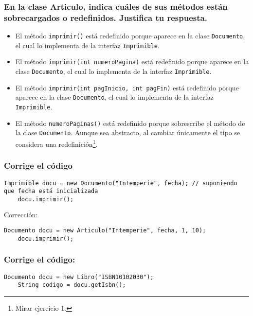 \documentclass[a4paper,12pt]{article}
\begin{document}
\subsubsection*{En la clase Articulo, indica cuáles de sus métodos están sobrecargados o redefinidos. Justifica tu respuesta.}

\begin{itemize}
    \item El método \texttt{imprimir()} está redefinido porque aparece en la clase \texttt{Documento}, el cual lo implementa de la interfaz \texttt{Imprimible}.
    \item El método \texttt{imprimir(int numeroPagina)} está redefinido porque aparece en la clase \texttt{Documento}, el cual lo implementa de la interfaz \texttt{Imprimible}.
    \item El método \texttt{imprimir(int pagInicio, int pagFin)} está redefinido porque aparece en la clase \texttt{Documento}, el cual lo implementa de la interfaz \texttt{Imprimible}.
    \item El método \texttt{numeroPaginas()} está redefinido porque sobrescribe el método de la clase \texttt{Documento}. Aunque sea abstracto, al cambiar únicamente el tipo se considera una redefinición\footnote{Mirar ejercicio 1.}.
\end{itemize}

\subsubsection*{Corrige el código}

    \begin{lstlisting}[style=customjava, caption = {Código a corregir}]
    Imprimible docu = new Documento("Intemperie", fecha); // suponiendo que fecha está inicializada
    docu.imprimir();
    \end{lstlisting}

Corrección:
\begin{lstlisting}[style=customjava, caption={Corrección del código}]
    Documento docu = new Articulo("Intemperie", fecha, 1, 10);
    docu.imprimir();
\end{lstlisting}

\subsubsection*{Corrige el código:}
    \begin{lstlisting}[style=customjava, caption = {Código a corregir}]
    Documento docu = new Libro("ISBN10102030");
    String codigo = docu.getIsbn();
    \end{lstlisting}
\end{document}
